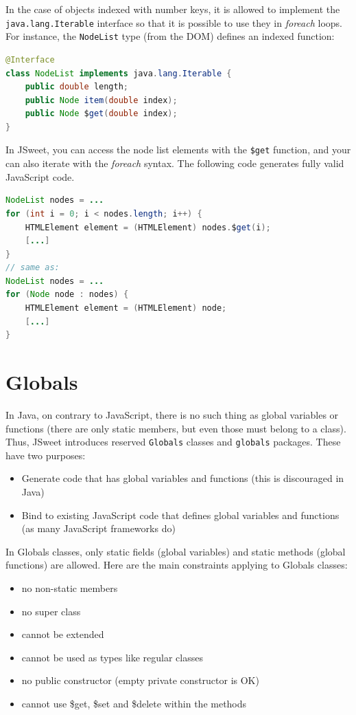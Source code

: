 \documentclass[a4paper]{report}
\begin{document}
In the case of objects indexed with number keys, it is allowed to implement the \texttt{java.lang.Iterable} interface so that it is possible to use they in \emph{foreach} loops. For instance, the \texttt{NodeList} type (from the DOM) defines an indexed function:

\begin{lstlisting}[language=Java]
@Interface
class NodeList implements java.lang.Iterable {
    public double length;
    public Node item(double index);
    public Node $get(double index);
}
\end{lstlisting}

In JSweet, you can access the node list elements with the \texttt{\$get} function, and your can also iterate with the \emph{foreach} syntax. The following code generates fully valid JavaScript code.

\begin{lstlisting}[language=Java]
NodeList nodes = ...
for (int i = 0; i < nodes.length; i++) {
	HTMLElement element = (HTMLElement) nodes.$get(i);
	[...]
}
// same as:
NodeList nodes = ...
for (Node node : nodes) {
	HTMLElement element = (HTMLElement) node;
	[...]
}
\end{lstlisting}

\section{Globals}

In Java, on contrary to JavaScript, there is no such thing as global variables or functions (there are only static members, but even those must belong to a class). Thus, JSweet introduces reserved \texttt{Globals} classes and \texttt{globals} packages. These have two purposes:

\begin{itemize}
\item Generate code that has global variables and functions (this is discouraged in Java)
\item Bind to existing JavaScript code that defines global variables and functions (as many JavaScript frameworks do)
\end{itemize}

In Globals classes, only static fields (global variables) and static methods (global functions) are allowed. Here are the main constraints applying to Globals classes:

\begin{itemize}
\item no non-static members
\item no super class
\item cannot be extended
\item cannot be used as types like regular classes
\item no public constructor (empty private constructor is OK)
\item cannot use \$get, \$set and \$delete within the methods
\end{itemize}
\end{document}
